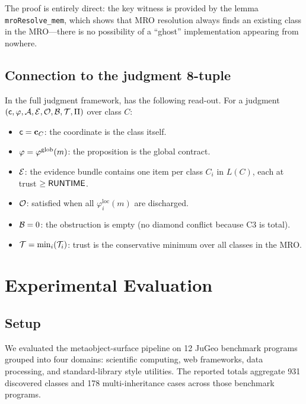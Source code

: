 \documentclass[11pt]{article}
\newcommand{\Clin}[1]{L(#1)}                     %
\newcommand{\ClassCoord}[1]{\mathbf{c}_{#1}}      %
\newcommand{\LocalContr}[1]{\varphi_{#1}^{\mathrm{loc}}}
\newcommand{\GlobalContr}[1]{\varphi_{#1}^{\mathrm{glob}}}
\begin{document}
The proof is entirely direct: the key witness is provided by the lemma
\texttt{mroResolve\_mem}, which shows that MRO resolution always finds
an existing class in the MRO---there is no possibility of a ``ghost''
implementation appearing from nowhere.

\subsection{Connection to the judgment 8-tuple}

In the full \JuGeo{} judgment framework, 
has the following read-out.  For a judgment
$(\mathsf{c}, \varphi, \mathcal{A}, \mathcal{E}, \mathcal{O}, \mathcal{B}, \mathcal{T}, \Pi)$
over class $C$:
\begin{itemize}[leftmargin=1.5em]
  \item $\coord = \ClassCoord{C}$: the coordinate is the class itself.
  \item $\prop = \GlobalContr{}(m)$: the proposition is the global contract.
  \item $\mathcal{E}$: the evidence bundle contains one item per class $C_i$
    in $\Clin{C}$, each at trust $\ge \mathsf{RUNTIME}$.
  \item $\mathcal{O}$: satisfied when all $\LocalContr{i}(m)$ are discharged.
  \item $\mathcal{B} = 0$: the obstruction is empty (no diamond conflict
    because C3 is total).
  \item $\mathcal{T} = \min_i(\mathcal{T}_i)$: trust is the conservative minimum
    over all classes in the MRO.
\end{itemize}

\section{Experimental Evaluation}\label{sec:eval}

\subsection{Setup}

We evaluated the metaobject-surface pipeline on 12 JuGeo benchmark
programs grouped into four domains: scientific computing, web
frameworks, data processing, and standard-library style utilities.  The
reported totals aggregate 931 discovered classes and 178
multi-inheritance cases across those benchmark programs.
\end{document}
